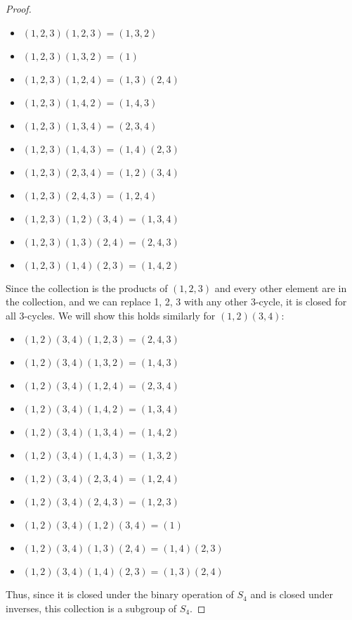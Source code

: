 \documentclass{article}
\begin{document}
\begin{proof}
  \begin{itemize}
    \item $(1, 2, 3)(1, 2, 3) = (1, 3, 2)$
    \item $(1, 2, 3)(1, 3, 2) = (1)$
    \item $(1, 2, 3)(1, 2, 4) = (1, 3)(2, 4)$
    \item $(1, 2, 3)(1, 4, 2) = (1, 4, 3)$
    \item $(1, 2, 3)(1, 3, 4) = (2, 3, 4)$
    \item $(1, 2, 3)(1, 4, 3) = (1, 4)(2, 3)$
    \item $(1, 2, 3)(2, 3, 4) = (1, 2)(3, 4)$
    \item $(1, 2, 3)(2, 4, 3) = (1, 2, 4)$
    \item $(1, 2, 3)(1, 2)(3, 4) = (1, 3, 4)$
    \item $(1, 2, 3)(1, 3)(2, 4) = (2, 4, 3)$
    \item $(1, 2, 3)(1, 4)(2, 3) = (1, 4, 2)$
  \end{itemize}

  Since the collection is the products of $(1, 2, 3)$ and every other element are in the collection, and we can replace 1, 2, 3 with any other 3-cycle, it is closed for all 3-cycles. We will show this holds similarly for $(1, 2)(3, 4)$:

  \begin{itemize}
    \item $(1, 2)(3, 4)(1, 2, 3) = (2, 4, 3)$
    \item $(1, 2)(3, 4)(1, 3, 2) = (1, 4, 3)$
    \item $(1, 2)(3, 4)(1, 2, 4) = (2, 3, 4)$
    \item $(1, 2)(3, 4)(1, 4, 2) = (1, 3, 4)$
    \item $(1, 2)(3, 4)(1, 3, 4) = (1, 4, 2)$
    \item $(1, 2)(3, 4)(1, 4, 3) = (1, 3, 2)$
    \item $(1, 2)(3, 4)(2, 3, 4) = (1, 2, 4)$
    \item $(1, 2)(3, 4)(2, 4, 3) = (1, 2, 3)$
    \item $(1, 2)(3, 4)(1, 2)(3, 4) = (1)$
    \item $(1, 2)(3, 4)(1, 3)(2, 4) = (1, 4)(2, 3)$
    \item $(1, 2)(3, 4)(1, 4)(2, 3) = (1, 3)(2, 4)$
  \end{itemize}

  Thus, since it is closed under the binary operation of $S_4$ and is closed under inverses, this collection is a subgroup of $S_4$.
\end{proof}
\end{document}
